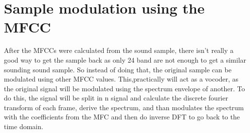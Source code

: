 \section{Sample modulation using the MFCC}

After the MFCCs were calculated from the sound sample, there isn't really a good way to get the sample back as only 24 band are not enough to get a similar sounding sound sample.
So instead of doing that, the original sample can be modulated using other MFCC values. This,practically will act as a vocoder, as the original signal will be modulated using the spectrum envelope of another.
To do this, the signal will be split in n signal and calculate the discrete fourier transform of each frame, derive the spectrum, and than modulates the spectrum with the coefficients from the MFC and then do inverse DFT to go back to the time domain.